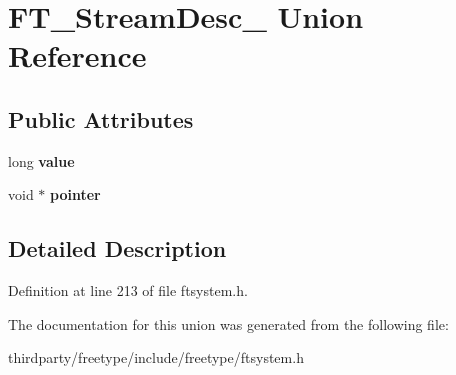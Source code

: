 \hypertarget{union_f_t___stream_desc__}{}\section{F\+T\+\_\+\+Stream\+Desc\+\_\+ Union Reference}
\label{union_f_t___stream_desc__}
\subsection*{Public Attributes}
\begin{DoxyCompactItemize}
\item 
\mbox{\label{union_f_t___stream_desc___a1a94493032faef1c3ed7bc33816ce90c}} 
long {\bfseries value}
\item 
\mbox{\label{union_f_t___stream_desc___a410ed102dc377fb9a5b9c950c3f863dc}} 
void $\ast$ {\bfseries pointer}
\end{DoxyCompactItemize}


\subsection{Detailed Description}


Definition at line 213 of file ftsystem.\+h.



The documentation for this union was generated from the following file\+:\begin{DoxyCompactItemize}
\item 
thirdparty/freetype/include/freetype/ftsystem.\+h\end{DoxyCompactItemize}
